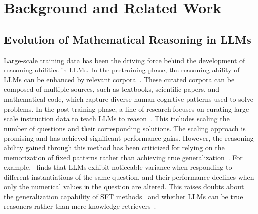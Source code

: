 \section{Background and Related Work}
\subsection{Evolution of Mathematical Reasoning in LLMs}







Large-scale training data has been the driving force behind the development of reasoning abilities in LLMs. In the pretraining phase, the reasoning ability of LLMs can be enhanced by relevant corpora~\cite{wang2024mathpilebilliontokenscalepretrainingcorpus,azerbayev2024llemmaopenlanguagemodel,paster2023openwebmathopendatasethighquality,shao2024deepseekmath}. These curated corpora can be composed of multiple sources, such as textbooks, scientific papers, and mathematical code, which capture diverse human cognitive patterns used to solve problems. In the post-training phase, a line of research focuses on curating large-scale instruction data to teach LLMs to reason~\cite{yue2023mammothbuildingmathgeneralist,yue2024mammoth2scalinginstructionsweb,li2024common7blanguagemodels}. This includes scaling the number of questions and their corresponding solutions. The scaling approach is promising and has achieved significant performance gains. However, the reasoning ability gained through this method has been criticized for relying on the memorization of fixed patterns rather than achieving true generalization~\cite{mirzadeh2024gsmsymbolicunderstandinglimitationsmathematical,zhang2024carefulexaminationlargelanguage}. For example,~\citet{mirzadeh2024gsmsymbolicunderstandinglimitationsmathematical} finds that LLMs exhibit noticeable variance when responding to different instantiations of the same question, and their performance declines when only the numerical values in the question are altered. This raises doubts about the generalization capability of SFT methods~\cite{chu2025sftmemorizesrlgeneralizes} and whether LLMs can be true reasoners rather than mere knowledge retrievers~\cite{Kambhampati_2024}.  



